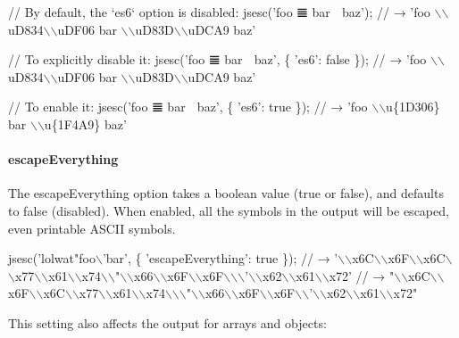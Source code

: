 \begin{DoxyCode}
// By default, the `es6` option is disabled:
jsesc('foo 𝌆 bar 💩 baz');
// → 'foo \(\backslash\)\(\backslash\)uD834\(\backslash\)\(\backslash\)uDF06 bar \(\backslash\)\(\backslash\)uD83D\(\backslash\)\(\backslash\)uDCA9 baz'

// To explicitly disable it:
jsesc('foo 𝌆 bar 💩 baz', \{
  'es6': false
\});
// → 'foo \(\backslash\)\(\backslash\)uD834\(\backslash\)\(\backslash\)uDF06 bar \(\backslash\)\(\backslash\)uD83D\(\backslash\)\(\backslash\)uDCA9 baz'

// To enable it:
jsesc('foo 𝌆 bar 💩 baz', \{
  'es6': true
\});
// → 'foo \(\backslash\)\(\backslash\)u\{1D306\} bar \(\backslash\)\(\backslash\)u\{1F4A9\} baz'
\end{DoxyCode}


\paragraph*{{\ttfamily escape\+Everything}}

The {\ttfamily escape\+Everything} option takes a boolean value ({\ttfamily true} or {\ttfamily false}), and defaults to {\ttfamily false} (disabled). When enabled, all the symbols in the output will be escaped, even printable A\+S\+C\+II symbols.


\begin{DoxyCode}
jsesc('lolwat"foo\(\backslash\)'bar', \{
  'escapeEverything': true
\});
// → '\(\backslash\)\(\backslash\)x6C\(\backslash\)\(\backslash\)x6F\(\backslash\)\(\backslash\)x6C\(\backslash\)\(\backslash\)x77\(\backslash\)\(\backslash\)x61\(\backslash\)\(\backslash\)x74\(\backslash\)\(\backslash\)"\(\backslash\)\(\backslash\)x66\(\backslash\)\(\backslash\)x6F\(\backslash\)\(\backslash\)x6F\(\backslash\)\(\backslash\)\(\backslash\)'\(\backslash\)\(\backslash\)x62\(\backslash\)\(\backslash\)x61\(\backslash\)\(\backslash\)x72'
// → "\(\backslash\)\(\backslash\)x6C\(\backslash\)\(\backslash\)x6F\(\backslash\)\(\backslash\)x6C\(\backslash\)\(\backslash\)x77\(\backslash\)\(\backslash\)x61\(\backslash\)\(\backslash\)x74\(\backslash\)\(\backslash\)\(\backslash\)"\(\backslash\)\(\backslash\)x66\(\backslash\)\(\backslash\)x6F\(\backslash\)\(\backslash\)x6F\(\backslash\)\(\backslash\)'\(\backslash\)\(\backslash\)x62\(\backslash\)\(\backslash\)x61\(\backslash\)\(\backslash\)x72"
\end{DoxyCode}


This setting also affects the output for arrays and objects\+:


